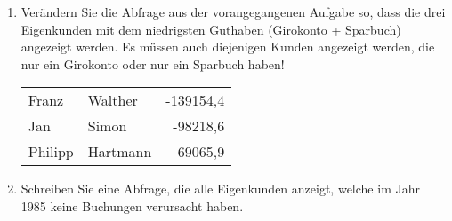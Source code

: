 \begin{enumerate}
\begin{center}
\begin{small}
          \end{small}
        \end{center}
        \item Verändern Sie die Abfrage aus der vorangegangenen Aufgabe so,
        dass die drei Eigenkunden mit dem niedrigsten Guthaben (Girokonto +
        Sparbuch) angezeigt werden. Es müssen auch diejenigen Kunden angezeigt
        werden, die nur ein Girokonto oder nur ein Sparbuch haben!
        \begin{center}
          \begin{small}
            \tablehead{}
            \begin{msoraclesql}
              \begin{supertabular}{llr}
                Franz & Walther & -139154,4 \\
                Jan & Simon & -98218,6 \\
                Philipp & Hartmann & -69065,9 \\
              \end{supertabular}
            \end{msoraclesql}
          \end{small}
        \end{center}
        \item Schreiben Sie eine Abfrage, die alle Eigenkunden anzeigt, welche
        im Jahr 1985 keine Buchungen verursacht haben.
        \begin{center}
          \begin{small}
            \tablehead{}
\end{small}
\end{center}
\end{enumerate}
